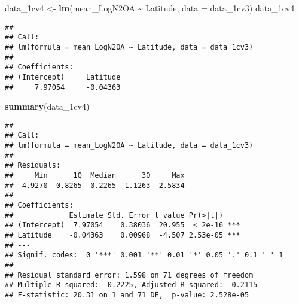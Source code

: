 \documentclass[
]{article}
\newenvironment{Shaded}{\begin{snugshade}}{\end{snugshade}}
\newcommand{\AttributeTok}[1]{\textcolor[rgb]{0.13,0.29,0.53}{#1}}
\newcommand{\FunctionTok}[1]{\textcolor[rgb]{0.13,0.29,0.53}{\textbf{#1}}}
\newcommand{\NormalTok}[1]{#1}
\newcommand{\OtherTok}[1]{\textcolor[rgb]{0.56,0.35,0.01}{#1}}
\newcommand{\SpecialCharTok}[1]{\textcolor[rgb]{0.81,0.36,0.00}{\textbf{#1}}}
\begin{document}
\begin{Shaded}
\begin{Highlighting}[]
\NormalTok{data\_1cv4 }\OtherTok{\textless{}{-}} \FunctionTok{lm}\NormalTok{(mean\_LogN2OA }\SpecialCharTok{\textasciitilde{}}\NormalTok{ Latitude, }\AttributeTok{data =}\NormalTok{ data\_1cv3)}
\NormalTok{data\_1cv4}
\end{Highlighting}
\end{Shaded}

\begin{verbatim}
## 
## Call:
## lm(formula = mean_LogN2OA ~ Latitude, data = data_1cv3)
## 
## Coefficients:
## (Intercept)     Latitude  
##     7.97054     -0.04363
\end{verbatim}

\begin{Shaded}
\begin{Highlighting}[]
\FunctionTok{summary}\NormalTok{(data\_1cv4)}
\end{Highlighting}
\end{Shaded}

\begin{verbatim}
## 
## Call:
## lm(formula = mean_LogN2OA ~ Latitude, data = data_1cv3)
## 
## Residuals:
##     Min      1Q  Median      3Q     Max 
## -4.9270 -0.8265  0.2265  1.1263  2.5834 
## 
## Coefficients:
##             Estimate Std. Error t value Pr(>|t|)    
## (Intercept)  7.97054    0.38036  20.955  < 2e-16 ***
## Latitude    -0.04363    0.00968  -4.507 2.53e-05 ***
## ---
## Signif. codes:  0 '***' 0.001 '**' 0.01 '*' 0.05 '.' 0.1 ' ' 1
## 
## Residual standard error: 1.598 on 71 degrees of freedom
## Multiple R-squared:  0.2225, Adjusted R-squared:  0.2115 
## F-statistic: 20.31 on 1 and 71 DF,  p-value: 2.528e-05
\end{verbatim}
\end{document}
